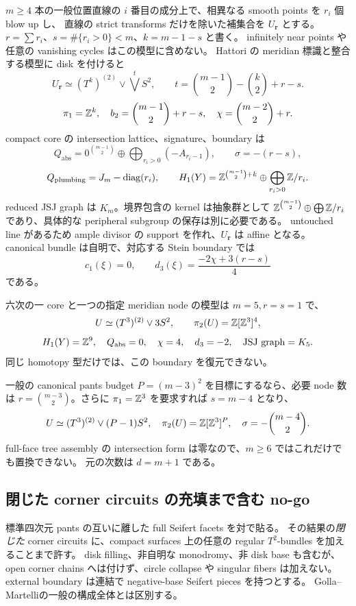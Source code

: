 \documentclass[11pt,a4paper]{article}
\begin{document}
$m\ge4$ 本の一般位置直線の $i$ 番目の成分上で、相異なる smooth points を $r_i$ 個 blow up し、
直線の strict transforms だけを除いた補集合を $U_{\boldsymbol r}$ とする。
$r=\sum r_i$、$s=\#\{r_i>0\}<m$、$k=m-1-s$ と書く。
infinitely near points や任意の vanishing cycles はこの模型に含めない。
Hattori の meridian 標識と整合する模型\cite{Hattori,PapadimaSuciu}に disk を付けると
\[
 U_{\boldsymbol r}\simeq(T^k)^{(2)}\vee\bigvee^tS^2,
 \qquad t=\binom{m-1}{2}-\binom{k}{2}+r-s.
\]
\[
 \pi_1=\mathbb Z^k,\quad b_2=\binom{m-1}{2}+r-s,\quad
 \chi=\binom{m-2}{2}+r.
\]
compact core の intersection lattice、signature、boundary は
\[
 Q_{\mathrm{abs}}=0^{\binom{m-1}{2}}\oplus\bigoplus_{r_i>0}(-A_{r_i-1}),
 \qquad \sigma=-(r-s),
\]
\[
 Q_{\mathrm{plumbing}}=J_m-\operatorname{diag}(r_i),\qquad
 H_1(Y)=\mathbb Z^{\binom{m-1}{2}+k}\oplus\bigoplus_{r_i>0}\mathbb Z/r_i.
\]
reduced JSJ graph は $K_m$。境界包含の kernel は抽象群として
$\mathbb Z^{\binom{m-1}{2}}\oplus\bigoplus\mathbb Z/r_i$ であり、具体的な peripheral subgroup の保存は別に必要である。
untouched line があるため ample divisor の support を作れ、$U_{\boldsymbol r}$ は affine となる。
canonical bundle は自明で、対応する Stein boundary では
\[
 c_1(\xi)=0,\qquad d_3(\xi)=\frac{-2\chi+3(r-s)}4
\]
である\cite{Gompf}。

六次の一 core と一つの指定 meridian node の模型は $m=5,r=s=1$ で、
\[
 U\simeq(T^3)^{(2)}\vee3S^2,\qquad
 \pi_2(U)=\mathbb Z[\mathbb Z^3]^4,
\]
\[
 H_1(Y)=\mathbb Z^9,\quad Q_{\mathrm{abs}}=0,\quad
 \chi=4,\quad d_3=-2,\quad \text{JSJ graph}=K_5.
\]
同じ homotopy 型だけでは、この boundary を復元できない。

一般の canonical pants budget $P=(m-3)^2$ を目標にするなら、必要 node 数は
$r=\binom{m-3}{2}$。さらに $\pi_1=\mathbb Z^3$ を要求すれば $s=m-4$ となり、
\[
 U\simeq(T^3)^{(2)}\vee(P-1)S^2,\quad
 \pi_2(U)=\mathbb Z[\mathbb Z^3]^P,\quad
 \sigma=-\binom{m-4}{2}.
\]
full-face tree assembly の intersection form は零なので、$m\ge6$ ではこれだけでも置換できない。
元の次数は $d=m+1$ である。

\subsection{閉じた corner circuits の充填まで含む no-go}

標準四次元 pants の互いに離した full Seifert facets を対で貼る。
その結果の\emph{閉じた} corner circuits に、compact surfaces 上の任意の regular $T^2$-bundles を加えることまで許す。
disk filling、非自明な monodromy、非 disk base も含むが、open corner chains へは付けず、circle collapse や singular fibers は加えない。
external boundary は連結で negative-base Seifert pieces を持つとする。
Golla--Martelli\cite[Proposition 4.3, Remark 4.9]{GollaMartelli}の一般の構成全体とは区別する。
\end{document}
